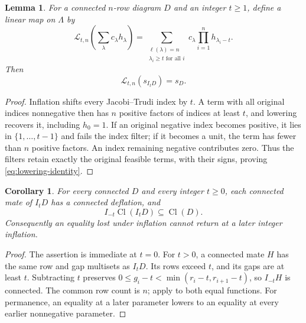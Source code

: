 \documentclass[11pt,a4paper]{amsart}
\numberwithin{equation}{section}
\theoremstyle{plain}
\newtheorem{lemma}[theorem]{Lemma}
\newtheorem{corollary}[theorem]{Corollary}
\theoremstyle{definition}
\begin{document}
\begin{lemma}\label{lem:inflation-lowering}
For a connected \(n\)-row diagram \(D\) and an integer \(t\ge1\),
define a linear map on \(\Lambda\) by
\begin{equation}\label{eq:lowering-map}
 \mathcal L_{t,n}\!\left(\sum_\lambda c_\lambda h_\lambda\right)
 =\sum_{\substack{\ell(\lambda)=n\\ \lambda_i\ge t\text{ for all }i}}
 c_\lambda\prod_{i=1}^n h_{\lambda_i-t}.
\end{equation}
Then
\begin{equation}\label{eq:lowering-identity}
 \mathcal L_{t,n}(s_{I_tD})=s_D.
\end{equation}
\end{lemma}

\begin{proof}
Inflation shifts every Jacobi--Trudi index by \(t\).  A term with
all original indices nonnegative then has \(n\) positive factors of
indices at least \(t\), and lowering recovers it, including \(h_0=1\).
If an original negative index becomes positive, it lies in
\(\{1,\ldots,t-1\}\) and fails the index filter; if it becomes a unit,
the term has fewer than \(n\) positive factors.  An index remaining
negative contributes zero.  Thus the filters retain exactly the
original feasible terms, with their signs, proving
\eqref{eq:lowering-identity}.
\end{proof}

\begin{corollary}\label{cor:inflation-no-escape}
For every connected \(D\) and every integer \(t\ge0\), each
connected mate of \(I_tD\) has a connected deflation, and
\begin{equation}\label{eq:no-escape}
 I_{-t}\operatorname{Cl}(I_tD)\subseteq\operatorname{Cl}(D).
\end{equation}
Consequently an equality lost under inflation cannot return at a later
integer inflation.
\end{corollary}

\begin{proof}
The assertion is immediate at \(t=0\).  For \(t>0\), a connected
mate \(H\) has the same row and gap multisets as \(I_tD\).
Its rows exceed \(t\), and its gaps are at least \(t\).
Subtracting \(t\) preserves
\(0\le g_i-t<\min(r_i-t,r_{i+1}-t)\), so \(I_{-t}H\) is
connected.  The common row count is \(n\); apply
 to both equal functions.
For permanence, an equality at a later parameter lowers to an equality
at every earlier nonnegative parameter.
\end{proof}
\end{document}
